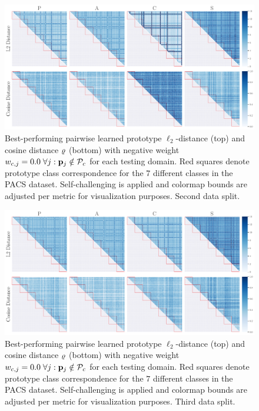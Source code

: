 \begin{figure}[ht]
    \centering
    \includegraphics[width=\textwidth]{Figures/Chapter4/2021-01-21-ProDropIncorrectWeight0.0WithSCdrop_f0.5SAVEResNet18oracle_validation_trial1.pdf}
    \caption[Second data split pairwise self-challenging prototype distances with $w_{c,j} = 0.0$] {Best-performing pairwise learned prototype $\ell_2$-distance (top) and cosine distance $\varrho$ (bottom) with negative weight $w_{c,j} = 0.0\; \forall j: \mathbf{p}_{j} \notin \mathcal{P}_c$ for each testing domain. Red squares denote prototype class correspondence for the $7$ different classes in the PACS dataset. Self-challenging is applied and colormap bounds are adjusted per metric for visualization purposes. Second data split.}
    \label{fig:pw_distance_0.0_trial1-sc}
\end{figure}

\begin{figure}[ht]
    \centering
    \includegraphics[width=\textwidth]{Figures/Chapter4/2021-01-21-ProDropIncorrectWeight0.0WithSCdrop_f0.5SAVEResNet18oracle_validation_trial2.pdf}
    \caption[Third data split pairwise self-challenging prototype distances with $w_{c,j} = 0.0$] {Best-performing pairwise learned prototype $\ell_2$-distance (top) and cosine distance $\varrho$ (bottom) with negative weight $w_{c,j} = 0.0\; \forall j: \mathbf{p}_{j} \notin \mathcal{P}_c$ for each testing domain. Red squares denote prototype class correspondence for the $7$ different classes in the PACS dataset. Self-challenging is applied and colormap bounds are adjusted per metric for visualization purposes. Third data split.}
    \label{fig:pw_distance_0.0_trial2-sc}
\end{figure}